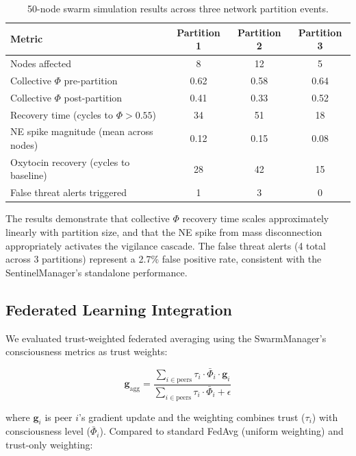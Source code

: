 \documentclass[11pt,a4paper]{article}
\begin{document}
\begin{table}[h]
\centering
\caption{50-node swarm simulation results across three network partition events.}
\label{tab:sim}
\begin{tabular}{lccc}
\toprule
\textbf{Metric} & \textbf{Partition 1} & \textbf{Partition 2} & \textbf{Partition 3} \\
\midrule
Nodes affected & 8 & 12 & 5 \\
Collective $\Phi$ pre-partition & 0.62 & 0.58 & 0.64 \\
Collective $\Phi$ post-partition & 0.41 & 0.33 & 0.52 \\
Recovery time (cycles to $\Phi > 0.55$) & 34 & 51 & 18 \\
NE spike magnitude (mean across nodes) & 0.12 & 0.15 & 0.08 \\
Oxytocin recovery (cycles to baseline) & 28 & 42 & 15 \\
False threat alerts triggered & 1 & 3 & 0 \\
\bottomrule
\end{tabular}
\end{table}

The results demonstrate that collective $\Phi$ recovery time scales approximately linearly with partition size, and that the NE spike from mass disconnection appropriately activates the vigilance cascade. The false threat alerts (4 total across 3 partitions) represent a 2.7\% false positive rate, consistent with the SentinelManager's standalone performance.

\subsection{Federated Learning Integration}

We evaluated trust-weighted federated averaging using the SwarmManager's consciousness metrics as trust weights:

\begin{equation}
\mathbf{g}_{\text{agg}} = \frac{\sum_{i \in \text{peers}} \tau_i \cdot \bar{\Phi}_i \cdot \mathbf{g}_i}{\sum_{i \in \text{peers}} \tau_i \cdot \bar{\Phi}_i + \epsilon}
\end{equation}

where $\mathbf{g}_i$ is peer $i$'s gradient update and the weighting combines trust ($\tau_i$) with consciousness level ($\bar{\Phi}_i$). Compared to standard FedAvg (uniform weighting) and trust-only weighting:
\end{document}
